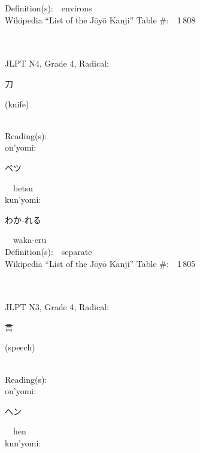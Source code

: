 \begin{multicols}{2}
Definition(s):\ \ environs \\
Wikipedia ``List of the J\=oy\=o Kanji'' Table \#:\ \ 1\,808 \\
\ \ \\
{\fontsize{34pt}{40pt}  }\ \ \\  %
{JLPT N4, Grade 4, Radical:\ \ {\begin{CJK}{UTF8}{min} 刀 \end{CJK}} (knife) } \\
Reading(s):\ \ \\
{\hspace*{1em}}on'yomi:\ \ \\
{\hspace*{2em}}{\begin{CJK}{UTF8}{min} ベツ \end{CJK}}\ \ betsu\ \ \\
{\hspace*{1em}}kun'yomi:\ \ \\
{\hspace*{2em}}{\begin{CJK}{UTF8}{min} わか-れる \end{CJK}}\ \ waka-eru\ \ \\
Definition(s):\ \ separate \\
Wikipedia ``List of the J\=oy\=o Kanji'' Table \#:\ \ 1\,805 \\
\ \ \\
{\fontsize{34pt}{40pt}  }\ \ \\  %
{JLPT N3, Grade 4, Radical:\ \ {\begin{CJK}{UTF8}{min} 言 \end{CJK}} (speech) } \\
Reading(s):\ \ \\
{\hspace*{1em}}on'yomi:\ \ \\
{\hspace*{2em}}{\begin{CJK}{UTF8}{min} ヘン \end{CJK}}\ \ hen\ \ \\
{\hspace*{1em}}kun'yomi:\ \ \\

\end{multicols}

